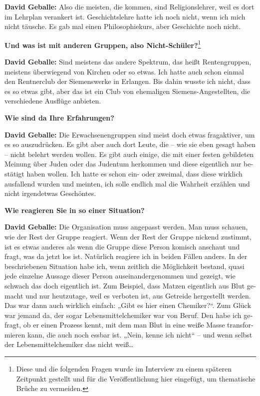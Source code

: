 \begin{otherlanguage}{ngerman}
\textbf{David Geballe:} Also die meisten, die kommen, sind Religionslehrer, weil es dort im Lehrplan verankert ist. Geschichtslehre hatte ich noch nicht, wenn ich mich nicht täusche. Es gab mal einen Philosophiekurs, aber Geschichte noch nicht. 

\textbf{Und was ist mit anderen Gruppen, also Nicht-Schüler?}\footnote{Diese und die folgenden Fragen wurde im Interview zu einem späteren Zeitpunkt gestellt und für die Veröffentlichung hier eingefügt, um thematische Brüche zu vermeiden.} 

\textbf{David Geballe:} Sind meistens das andere Spektrum, das heißt Rentengruppen, meistens überwiegend von Kirchen oder so etwas. Ich hatte auch schon einmal den Rentnerclub der Siemenswerke in Erlangen. Bis dahin wusste ich nicht, dass es so etwas gibt, aber das ist ein Club von ehemaligen Siemens-Angestellten, die verschiedene Ausflüge anbieten. 

\textbf{Wie sind da Ihre Erfahrungen?} 

\textbf{David Geballe:} Die Erwachsenengruppen sind meist doch etwas fragaktiver, um es so auszudrücken. Es gibt aber auch dort Leute, die – wie sie eben gesagt haben – nicht belehrt werden wollen. Es gibt auch einige, die mit einer festen gebildeten Meinung über Juden oder das Judentum herkommen und diese eigentlich nur bestätigt haben wollen. Ich hatte es schon ein- oder zweimal, dass diese wirklich ausfallend wurden und meinten, ich solle endlich mal die Wahrheit erzählen und nicht irgendetwas Geschöntes. 

\textbf{Wie reagieren Sie in so einer Situation?} 

\textbf{David Geballe:} Die Organisation muss angepasst werden. Man muss schauen, wie der Rest der Gruppe reagiert. Wenn der Rest der Gruppe nickend zustimmt, ist es etwas anderes als wenn die Gruppe diese Person komisch anschaut und fragt, was da jetzt los ist. Natürlich reagiere ich in beiden Fällen anders. 
In der beschriebenen Situation habe ich, wenn zeitlich die Möglichkeit bestand, quasi jede einzelne Aussage dieser Person auseinandergenommen und gezeigt, wie schwach das doch eigentlich ist. Zum Beispiel, dass Matzen eigentlich aus Blut gemacht und nur heutzutage, weil es verboten ist, aus Getreide hergestellt werden. Das war dann auch wirklich einfach: „Gibt es hier einen Chemiker?“. Zum Glück war jemand da, der sogar Lebensmittelchemiker war von Beruf. Den habe ich gefragt, ob er einen Prozess kennt, mit dem man Blut in eine weiße Masse transformieren kann, die auch noch essbar ist. „Nein, kenne ich nicht“ – und wenn selbst der Lebensmittelchemiker das nicht weiß… 


\end{otherlanguage}
